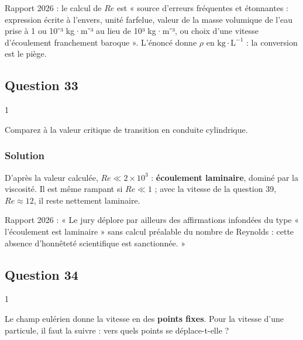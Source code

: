 \documentclass[11pt,a4paper]{article}
\begin{document}
\begin{piege}

Rapport 2026 : le calcul de \(Re\) est « source d'erreurs fréquentes et étonnantes : expression écrite à l'envers, unité farfelue, valeur de la masse volumique de l'eau prise à 1 ou 10⁻³ kg·m⁻³ au lieu de 10³ kg·m⁻³, ou choix d'une vitesse d'écoulement franchement baroque ». L'énoncé donne \(\rho\) en \(\mathrm{kg\cdot L^{-1}}\) : la conversion est le piège.

\end{piege}

\hypertarget{question-33}{%
\subsection{Question 33}\label{question-33}}

\begin{indication}{1}

Comparez à la valeur critique de transition en conduite cylindrique.

\end{indication}

\hypertarget{solution-32}{%
\subsubsection{Solution}\label{solution-32}}

D'après la valeur calculée, \(Re\ll2\times10^3\) : \textbf{écoulement laminaire}, dominé par la viscosité. Il est même rampant si \(Re\ll1\) ; avec la vitesse de la question 39, \(Re\approx12\), il reste nettement laminaire.

\begin{jury}

Rapport 2026 : « Le jury déplore par ailleurs des affirmations infondées du type « l'écoulement est laminaire » sans calcul préalable du nombre de Reynolds : cette absence d'honnêteté scientifique est sanctionnée. »

\end{jury}

\hypertarget{question-34}{%
\subsection{Question 34}\label{question-34}}

\begin{indication}{1}

Le champ eulérien donne la vitesse en des \textbf{points fixes}. Pour la vitesse d'une particule, il faut la suivre : vers quels points se déplace-t-elle ?

\end{indication}
\end{document}
